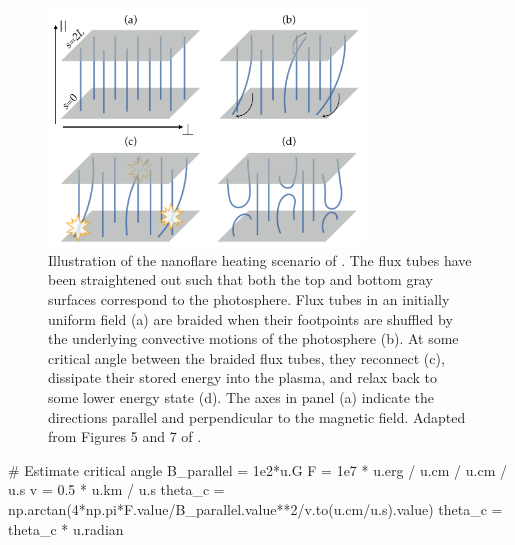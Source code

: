 \begin{figure}[!h]
    \centering
    \includegraphics[width=0.75\textwidth]{chapter1/figures/nanoflare-cartoon.pdf}
    \caption{Illustration of the nanoflare heating scenario of \citet{parker_nanoflares_1988}. The flux tubes have been straightened out such that both the top and bottom gray surfaces correspond to the photosphere. Flux tubes in an initially uniform field (a) are braided when their footpoints are shuffled by the underlying convective motions of the photosphere (b). At some critical angle between the braided flux tubes, they reconnect (c), dissipate their stored energy into the plasma, and relax back to some lower energy state (d). The axes in panel (a) indicate the directions parallel and perpendicular to the magnetic field. Adapted from Figures 5 and 7 of \citet{klimchuk_key_2015}.}
    \label{fig:nanoflare-cartoon}
\end{figure}

\begin{pycode}[chapter2]
# Estimate critical angle
B_parallel = 1e2*u.G
F = 1e7 * u.erg / u.cm / u.cm / u.s
v = 0.5 * u.km / u.s
theta_c = np.arctan(4*np.pi*F.value/B_parallel.value**2/v.to(u.cm/u.s).value)
theta_c = theta_c * u.radian
\end{pycode}

